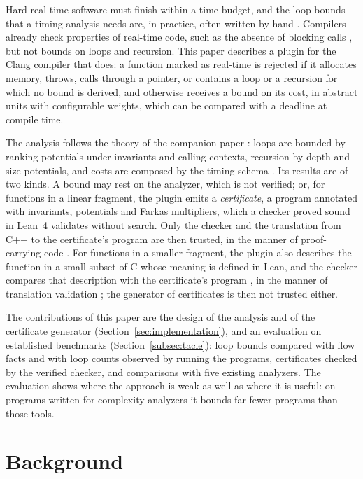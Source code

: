 \documentclass[oneside,english]{amsart}
\numberwithin{equation}{section}
\numberwithin{figure}{section}
\theoremstyle{plain}
\theoremstyle{definition}
\theoremstyle{plain}
\theoremstyle{remark}
\theoremstyle{plain}
\theoremstyle{definition}
\theoremstyle{plain}
\theoremstyle{remark}
\begin{document}
Hard real-time software must finish within a time budget, and the loop bounds that a timing analysis needs are, in practice, often written by hand \cite{wilhelm2008worst}. Compilers already check properties of real-time code, such as the absence of blocking calls \cite{clangeffects}, but not bounds on loops and recursion. This paper describes a plugin for the Clang compiler that does: a function marked as real-time is rejected if it allocates memory, throws, calls through a pointer, or contains a loop or a recursion for which no bound is derived, and otherwise receives a bound on its cost, in abstract units with configurable weights, which can be compared with a deadline at compile time.

The analysis follows the theory of the companion paper \cite{crosscheckTheory}: loops are bounded by ranking potentials under invariants and calling contexts, recursion by depth and size potentials, and costs are composed by the timing schema \cite{shaw1989reasoning,puschner1989calculating}. Its results are of two kinds. A bound may rest on the analyzer, which is not verified; or, for functions in a linear fragment, the plugin emits a \emph{certificate}, a program annotated with invariants, potentials and Farkas multipliers, which a checker proved sound in Lean~4 \cite{demoura2021lean4,crosscheckTheory} validates without search. Only the checker and the translation from C++ to the certificate's program are then trusted, in the manner of proof-carrying code \cite{necula1997proof}. For functions in a smaller fragment, the plugin also describes the function in a small subset of C whose meaning is defined in Lean, and the checker compares that description with the certificate's program \cite[Theorem~\ref{I-thm:validated}]{crosscheckTheory}, in the manner of translation validation \cite{pnueli1998translation}; the generator of certificates is then not trusted either.

The contributions of this paper are the design of the analysis and of the certificate generator (Section~\ref{sec:implementation}), and an evaluation on established benchmarks (Section~\ref{subsec:tacle}): loop bounds compared with flow facts and with loop counts observed by running the programs, certificates checked by the verified checker, and comparisons with five existing analyzers. The evaluation shows where the approach is weak as well as where it is useful: on programs written for complexity analyzers it bounds far fewer programs than those tools.

\section{Background}
\label{sec:background}
\end{document}

